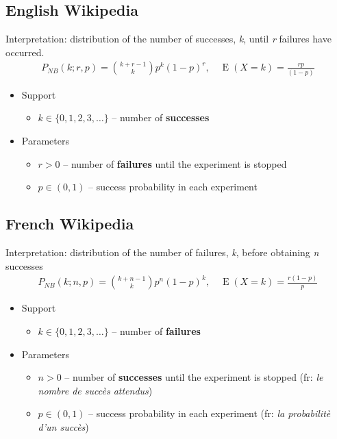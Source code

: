 \subsection*{English Wikipedia}
Interpretation: distribution of the number of successes, \emph{k}, until \emph{r} failures have occurred.
\begin{align*}
P_{N\!B}(k;r,p) = {k + r - 1 \choose k} p^k (1-p)^r, \quad \operatorname E(X\!=\!k)=\frac{rp}{(1-p)}
\end{align*}
\begin{itemize}
\item 
Support
\begin{itemize}
\item 
$k \in \{ 0, 1, 2, 3, \dots\}$ -- number of \textbf{successes}
\end{itemize}
\item 
Parameters 
\begin{itemize}
\item 
$r > 0$ -- number of \textbf{failures} until the experiment is stopped
\item 
$p \in (0,1)$ -- success probability in each experiment
\end{itemize}
\end{itemize}


\subsection*{French Wikipedia}
Interpretation: distribution of the number of failures, \emph{k}, before obtaining \emph{n} successes
\begin{align*}
P_{N\!B}(k;n,p) = {k + n - 1 \choose k} p^n (1-p)^k, \quad \operatorname E(X\!=\!k)=\frac{r(1-p)}{p}
\end{align*}
\begin{itemize}
\item 
Support
\begin{itemize}
\item 
$k \in \{ 0, 1, 2, 3, \dots\}$ -- number of \textbf{failures}
\end{itemize}
\item 
Parameters 
\begin{itemize}
\item 
$n > 0$ -- number of \textbf{successes} until the experiment is stopped (fr: \emph{le nombre de succ\`es attendus})
\item 
$p \in (0,1)$ -- success probability in each experiment (fr: \emph{la probabilit\`e d'un succ\`es})
\end{itemize}
\end{itemize}

